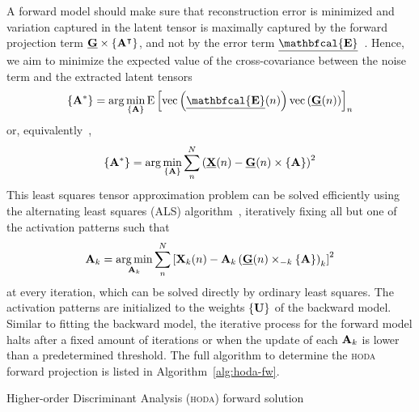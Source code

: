\documentclass[twocolumn]{article}
\begin{document}
A forward model should make sure that reconstruction error is minimized and
variation captured in the latent tensor is maximally captured by the forward
projection term $\ten{G}\mmpr{\mat{A}^\intercal}$, and not by the error term
$\ten{\mathbfcal{E}}$~\cite{Haufe2014}.
Hence, we aim to minimize the expected value of the cross-covariance between
the noise term and the extracted latent tensors
\begin{equation}
  \left\{\mat{A}^*\right\} = \arg\min_{\{\mat{A}\}}\text{E}\left[\text{vec}\left({\ten{\mathbfcal{E}}(n)}\right)\text{vec}\left({\ten{G}(n)}\right)\right]_n
\end{equation}
or, equivalently~\cite{Parra2005,Haufe2014},
\begin{equation}
  \left\{\mat{A}^*\right\} = \arg\min_{\{\mat{A}\}}\sum_n^N\left(\ten{X}(n) - \ten{G}(n)\mmpr{\mat{A}}\right)^2
\end{equation}
This least squares tensor approximation problem can be solved efficiently using the
alternating least squares (ALS) algorithm~\cite{Comon2009},
iteratively fixing all but one of the activation patterns such that
\begin{equation}
  \mat{A}_k = \argmin_{\mat{A}_k}
  \sum_n^N\left[\mat{X}_k(n) -
  \mat{A}_k\left(\ten{G}(n)\mmprs{\mat{A}}{k}\right)_k\right]^2
\end{equation}
at every iteration, which can be solved directly by ordinary least squares.
The activation patterns are initialized to the weights $\{\mat{U}\}$ of the
backward model.
Similar to fitting the backward model, the iterative process for the forward
model halts after a fixed amount of iterations or when the update of each
$\mat{A}_k$ is lower than a predetermined threshold.
The full algorithm to determine the \textsc{hoda} forward projection is listed
in Algorithm~\ref{alg:hoda-fw}.
\begin{algorithm}
  \caption{Higher-order Discriminant Analysis (\textsc{hoda}) forward solution}
  \label{alg:hoda-fw}
  
\end{algorithm}
\end{document}
